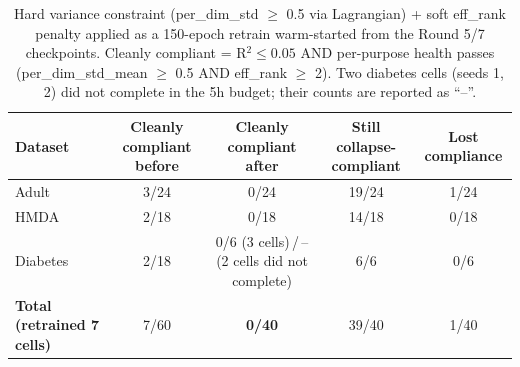 \begin{table}[t]
  \centering
  \caption{Hard variance constraint (per\_dim\_std $\geq$ 0.5 via Lagrangian)
  + soft eff\_rank penalty applied as a 150-epoch retrain warm-started from
  the Round 5/7 checkpoints. Cleanly compliant = R$^2 \leq 0.05$ AND
  per-purpose health passes (per\_dim\_std\_mean $\geq$ 0.5 AND eff\_rank
  $\geq$ 2). Two diabetes cells (seeds 1, 2) did not complete in the 5h
  budget; their counts are reported as ``--''.}
  \label{tab:varconstraint-comparison}
  \begin{tabular}{lcccc}
    \toprule
    Dataset  & Cleanly compliant before & Cleanly compliant after & Still collapse-compliant & Lost compliance \\
    \midrule
    Adult    & 3/24 & 0/24 & 19/24 & 1/24 \\
    HMDA     & 2/18 & 0/18 & 14/18 & 0/18 \\
    Diabetes & 2/18 & 0/6 (3 cells)\,/\,-- (2 cells did not complete) & 6/6 & 0/6 \\
    \midrule
    \textbf{Total (retrained 7 cells)} & 7/60 & \textbf{0/40} & 39/40 & 1/40 \\
    \bottomrule
  \end{tabular}
\end{table}

